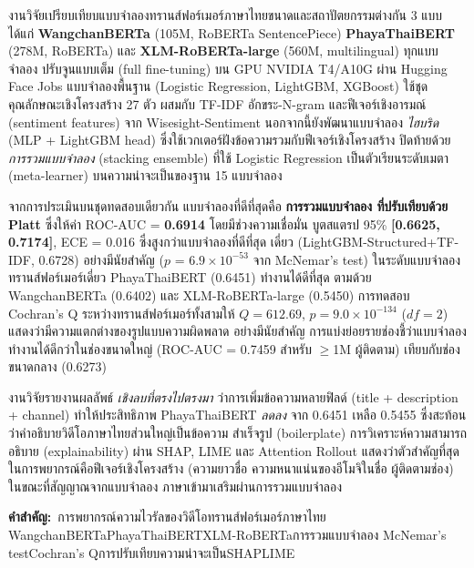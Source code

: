 งานวิจัยเปรียบเทียบแบบจำลองทรานส์ฟอร์เมอร์ภาษาไทยขนาดและสถาปัตยกรรมต่างกัน
3 แบบ ได้แก่ \textbf{WangchanBERTa} (105M, RoBERTa SentencePiece) \textbf{PhayaThaiBERT}
(278M, RoBERTa) และ \textbf{XLM-RoBERTa-large} (560M, multilingual) ทุกแบบจำลอง
ปรับจูนแบบเต็ม (full fine-tuning) บน GPU NVIDIA T4/A10G ผ่าน Hugging Face Jobs
แบบจำลองพื้นฐาน (Logistic Regression, LightGBM, XGBoost) ใช้ชุดคุณลักษณะเชิงโครงสร้าง
27 ตัว ผสมกับ TF-IDF อักขระ-N-gram และฟีเจอร์เชิงอารมณ์ (sentiment features) จาก
Wisesight-Sentiment นอกจากนี้ยังพัฒนาแบบจำลอง \emph{ไฮบริด} (MLP + LightGBM head)
ซึ่งใช้เวกเตอร์ฝังข้อความรวมกับฟีเจอร์เชิงโครงสร้าง ปิดท้ายด้วย \emph{การรวมแบบจำลอง}
(stacking ensemble) ที่ใช้ Logistic Regression เป็นตัวเรียนระดับเมตา (meta-learner)
บนความน่าจะเป็นของฐาน 15 แบบจำลอง

จากการประเมินบนชุดทดสอบเดียวกัน แบบจำลองที่ดีที่สุดคือ \textbf{การรวมแบบจำลอง
ที่ปรับเทียบด้วย Platt} ซึ่งให้ค่า ROC-AUC = \textbf{0.6914} โดยมีช่วงความเชื่อมั่น
บูตสแตรป 95\% \textbf{[0.6625, 0.7174]}, ECE = 0.016 ซึ่งสูงกว่าแบบจำลองที่ดีที่สุด
เดี่ยว (LightGBM-Structured+TF-IDF, 0.6728) อย่างมีนัยสำคัญ ($p$ = $6.9\!\times\!10^{-53}$
จาก McNemar's test) ในระดับแบบจำลองทรานส์ฟอร์เมอร์เดี่ยว PhayaThaiBERT (0.6451)
ทำงานได้ดีที่สุด ตามด้วย WangchanBERTa (0.6402) และ XLM-RoBERTa-large (0.5450)
การทดสอบ Cochran's Q ระหว่างทรานส์ฟอร์เมอร์ทั้งสามให้ $Q = 612.69$,
$p = 9.0\!\times\!10^{-134}$ ($df = 2$) แสดงว่ามีความแตกต่างของรูปแบบความผิดพลาด
อย่างมีนัยสำคัญ การแบ่งย่อยรายช่องชี้ว่าแบบจำลองทำงานได้ดีกว่าในช่องขนาดใหญ่
(ROC-AUC = 0.7459 สำหรับ $\geq$1M ผู้ติดตาม) เทียบกับช่องขนาดกลาง (0.6273)

งานวิจัยรายงานผลลัพธ์ \emph{เชิงลบที่ตรงไปตรงมา} ว่าการเพิ่มข้อความหลายฟิลด์
(title + description + channel) ทำให้ประสิทธิภาพ PhayaThaiBERT \emph{ลดลง}
จาก 0.6451 เหลือ 0.5455 ซึ่งสะท้อนว่าคำอธิบายวิดีโอภาษาไทยส่วนใหญ่เป็นข้อความ
สำเร็จรูป (boilerplate) การวิเคราะห์ความสามารถอธิบาย (explainability) ผ่าน SHAP,
LIME และ Attention Rollout แสดงว่าตัวสำคัญที่สุดในการพยากรณ์คือฟีเจอร์เชิงโครงสร้าง
(ความยาวชื่อ ความหนาแน่นของอีโมจิในชื่อ ผู้ติดตามช่อง) ในขณะที่สัญญาณจากแบบจำลอง
ภาษาเข้ามาเสริมผ่านการรวมแบบจำลอง

\vspace{0.4cm}
\noindent\textbf{คำสำคัญ:}\ การพยากรณ์ความไวรัลของวิดีโอ\quad ทรานส์ฟอร์เมอร์ภาษาไทย\quad
WangchanBERTa\quad PhayaThaiBERT\quad XLM-RoBERTa\quad การรวมแบบจำลอง\quad
McNemar's test\quad Cochran's Q\quad การปรับเทียบความน่าจะเป็น\quad SHAP\quad LIME

\newpage
